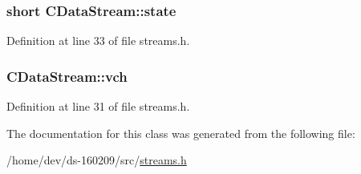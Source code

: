 \subsubsection[{state}]{\setlength{\rightskip}{0pt plus 5cm}short C\+Data\+Stream\+::state\hspace{0.3cm}{\ttfamily [protected]}}\label{class_c_data_stream_a45d5d8e33a27a84f26038b898adf3d43}


Definition at line 33 of file streams.\+h.

\hypertarget{class_c_data_stream_ac875adb8c720c48abd1a7c82f3452dda}{}
\subsubsection[{vch}]{ C\+Data\+Stream\+::vch\hspace{0.3cm}{\ttfamily [protected]}}\label{class_c_data_stream_ac875adb8c720c48abd1a7c82f3452dda}


Definition at line 31 of file streams.\+h.



The documentation for this class was generated from the following file\+:\begin{DoxyCompactItemize}
\item 
/home/dev/ds-\/160209/src/\hyperlink{streams_8h}{streams.\+h}\end{DoxyCompactItemize}
